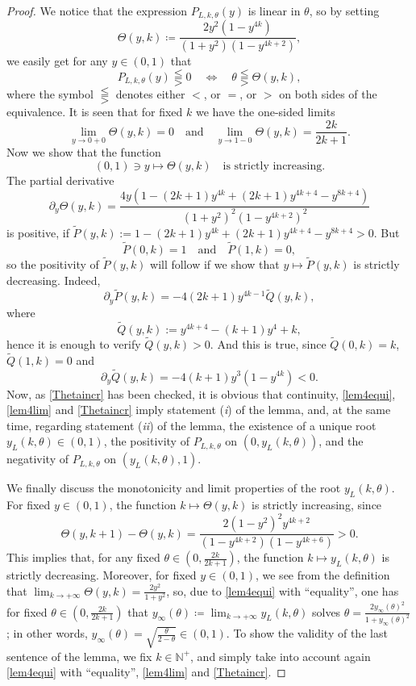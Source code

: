 \documentclass[smallextended,numbook,runningheads]{svjour3}     %
\newcommand{\te}{\theta}
\newcommand{\yl}{y_L(k,\theta)}
\newcommand{\nplus}{\mathbb{N}^+}
\newcommand{\Pol}{P_{L,k,\te}(y)}
\begin{document}
\begin{proof}
We notice that the expression $\Pol$ is linear in $\te$, so by setting 
\[
\Theta(y,k)\coloneqq\frac{2 y^2 \left(1-y^{4 k}\right)}{\left(1+y^2\right) \left(1-y^{4 k+2}\right)},
\]
we easily get for any $y\in(0,1)$ that
\begin{equation}\label{lem4equi}
\Pol \lesseqqgtr 0\quad \Longleftrightarrow \quad \te\lesseqqgtr\Theta(y,k),
\end{equation}
where the symbol $\lesseqqgtr$ denotes either $<$, or $=$, or $>$ on both sides of the equivalence. It is
seen that for fixed $k$ we have the one-sided limits
\begin{equation}\label{lem4lim}
\lim_{y\to 0+0}\Theta(y,k)=0\quad\text{and}\quad\lim_{y\to 1-0}\Theta(y,k)=\frac{2k}{2k+1}.
\end{equation}
Now we show that the function
\begin{equation}\label{Thetaincr}
(0,1)\ni y\mapsto \Theta(y,k)\quad\text{is strictly increasing.}
\end{equation}
The partial derivative
\[
\partial_y\Theta(y,k)=\frac{4 y \left(1-(2 k+1) y^{4 k}+(2 k+1) y^{4 k+4}-y^{8 k+4}\right)}{\left(1+y^2\right)^2 \left(1-y^{4 k+2}\right)^2}
\]
is positive, if $\widetilde{P}(y,k):=1-(2 k+1) y^{4 k}+(2 k+1) y^{4 k+4}-y^{8 k+4}>0$. But 
\[
\widetilde{P}(0,k)=1\quad\text{and}\quad\widetilde{P}(1,k)=0,
\]
so the positivity of $\widetilde{P}(y,k)$ will follow if we show that $y\mapsto\widetilde{P}(y,k)$ is strictly decreasing. Indeed,
\[
\partial_y\widetilde{P}(y,k)=-4 (2 k+1) y^{4 k-1} \widetilde{Q}(y,k),
\]
where
\[
\widetilde{Q}(y,k):=y^{4 k+4}-(k+1) y^4+k,
\]
hence it is enough to verify $\widetilde{Q}(y,k)>0$. And this is true, since $\widetilde{Q}(0,k)=k$, $\widetilde{Q}(1,k)=0$ and
\[
\partial_y \widetilde{Q}(y,k)=-4 (k+1) y^3 \left(1-y^{4 k}\right)<0.
\]
Now, as \eqref{Thetaincr} has been checked, it is obvious that continuity, \eqref{lem4equi}, \eqref{lem4lim} and \eqref{Thetaincr} imply statement (\textit{i}) of the lemma, and, at the same time, regarding statement (\textit{ii}) of the lemma, the existence of a unique root $\yl\in(0,1)$, the positivity of $P_{L,k,\te}$ on $(0,\yl)$, and the negativity of $P_{L,k,\te}$ on $(\yl,1)$.

We finally discuss the monotonicity and limit properties of the root $\yl$. For fixed $y\in(0,1)$, the function $k\mapsto\Theta(y,k)$ is strictly increasing, since
\[
\Theta(y,k+1)-\Theta(y,k)=\frac{2 \left(1-y^2\right)^2 y^{4 k+2}}{\left(1-y^{4 k+2}\right) \left(1-y^{4
   k+6}\right)}>0.
\]
This implies that, for any fixed $\te\in\left(0,\frac{2k}{2k+1}\right)$, the function $k\mapsto\yl$ is strictly decreasing. Moreover, for fixed $y\in(0,1)$, we see from the definition that $\lim_{k\to+\infty} \Theta(y,k)=\frac{2 y^2}{1+y^2}$,
so, due to \eqref{lem4equi} with ``equality'', one has for fixed $\te\in\left(0,\frac{2k}{2k+1}\right)$ that $y_{\infty}(\te)\coloneqq\lim_{k\to+\infty} \yl$ solves $\te=\frac{2 y_{\infty}(\te)^2}{1+y_{\infty}(\te)^2}$; in other words, $y_{\infty}(\te)=\sqrt{\frac{\te}{2-\te}}\in(0,1)$. To show the validity of the last sentence of the lemma, we fix $k\in\nplus$, and simply take into account again \eqref{lem4equi} with ``equality'', \eqref{lem4lim} and \eqref{Thetaincr}.
\end{proof}
\end{document}
